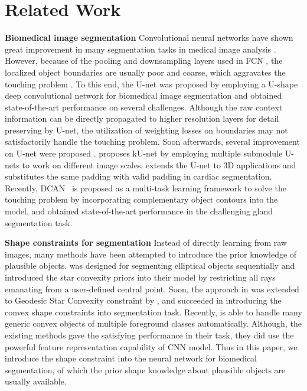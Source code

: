 \section{Related Work}
%

\noindent \textbf{Biomedical image segmentation} 
%
Convolutional neural networks have shown great improvement in many segmentation tasks in medical image analysis \cite{Dhungel2015a,Roth2015a,Roth2016,Chen2016e,Nogues2016,Dou2016,Qin2016,Chen2017,Ronneberger2015,Lieman-Sifry2017,Chen2016c}.
However, because of the pooling and downsampling layers used in FCN \cite{Long2015}, the localized object boundaries are usually poor and coarse, which aggravates the touching problem \cite{Dou2016,Chen2017,Ronneberger2015,Lieman-Sifry2017,Chen2016c}.
To this end, the U-net was proposed by employing a U-shape deep convolutional network for biomedical image segmentation and obtained state-of-the-art performance on several challenges.
Although the raw context information can be directly propagated to higher resolution layers for detail preserving by U-net, the utilization of weighting losses on boundaries may not satisfactorily handle the touching problem.
Soon afterwards, several improvement on U-net were proposed \cite{Lieman-Sifry2017,Chen2016c,Cicek2016}.
\cite{Chen2016c} proposes kU-net by employing multiple submodule U-nets to work on different image scales. 
\cite{Cicek2016} extends the U-net to 3D applications and \cite{Lieman-Sifry2017} substitutes the same padding with valid padding in cardiac segmentation.
%
Recently, DCAN~\cite{Chen2017} is proposed as a multi-task learning framework to solve the touching problem by incorporating complementary object contours into the model, and obtained state-of-the-art performance in the challenging gland segmentation task.
 

\noindent \textbf{Shape constraints for segmentation} Instead of directly learning from raw images, many methods have been attempted to introduce the prior knowledge of plausible objects.
\cite{Delgado-Gonzalo2012} was designed for segmenting elliptical objects sequentially and \cite{Veksler2008a} introduced the star convexity priors into their model by restricting all rays emanating from a user-defined central point.
Soon, the approach in \cite{Veksler2008a} was extended to Geodesic Star Convexity constraint by \cite{Gulshan2010a}, and \cite{Gorelick2014a} succeeded in introducing the convex shape constraints into segmentation task.
Recently, \cite{Royer2016a} is able to handle many generic convex objects of multiple foreground classes automatically.
Although, the existing methods gave the satisfying performance in their task, they did use the powerful feature representation capability of CNN model. 
Thus in this paper, we  introduce the shape constraint into the neural network for biomedical segmentation, of which the prior shape knowledge about plausible objects are usually available.
